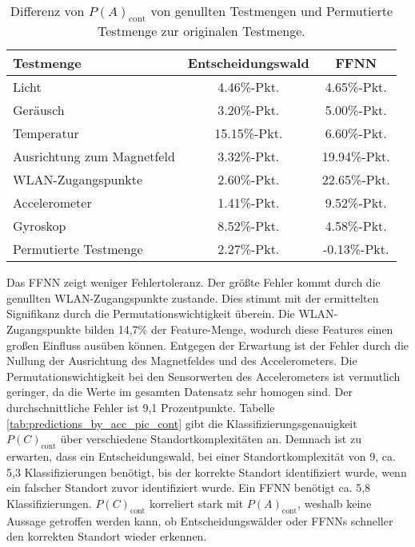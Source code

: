\begin{table}[h!]
    \centering
    \begin{tabular}{ | l | c | c | }
        \hline
        Testmenge & Entscheidungswald & FFNN \\\hline
        Licht & 4.46\%-Pkt. & 4.65\%-Pkt. \\\hline
        Geräusch & 3.20\%-Pkt. & 5.00\%-Pkt. \\\hline
        Temperatur & 15.15\%-Pkt. & 6.60\%-Pkt. \\\hline
        Ausrichtung zum Magnetfeld & 3.32\%-Pkt. & 19.94\%-Pkt. \\\hline
        WLAN-Zugangspunkte & 2.60\%-Pkt. & 22.65\%-Pkt. \\\hline
        Accelerometer & 1.41\%-Pkt. & 9.52\%-Pkt. \\\hline
        Gyroskop & 8.52\%-Pkt. & 4.58\%-Pkt. \\\hline
        Permutierte Testmenge & 2.27\%-Pkt. & -0.13\%-Pkt. \\\hline
    \end{tabular}
    \caption{Differenz von $P(A)_{\text{cont}}$ von genullten Testmengen und Permutierte Testmenge zur originalen Testmenge.}
    \label{tab:robustness_by_acc_cont}
\end{table}
\newline
\newline
Das FFNN zeigt weniger Fehlertoleranz.
Der größte Fehler kommt durch die genullten WLAN-Zugangspunkte zustande.
Dies stimmt mit der ermittelten Signifikanz durch die Permutationswichtigkeit überein.
Die WLAN-Zugangspunkte bilden 14,7\% der Feature-Menge, wodurch diese Features einen großen Einfluss ausüben können.
\newline
Entgegen der Erwartung ist der Fehler durch die Nullung der Ausrichtung des Magnetfeldes und des Accelerometers.
Die Permutationswichtigkeit bei den Sensorwerten des Accelerometers ist vermutlich geringer,
da die Werte im gesamten Datensatz sehr homogen sind.
Der durchschnittliche Fehler ist 9,1 Prozentpunkte.
\newpage
Tabelle \ref{tab:predictions_by_acc_pic_cont} gibt die Klassifizierungsgenauigkeit $P(C)_{\text{cont}}$ über verschiedene Standortkomplexitäten an.
Demnach ist zu erwarten, dass ein Entscheidungswald, bei einer Standortkomplexität von 9, ca. 5,3 Klassifizierungen benötigt, bis der korrekte Standort identifiziert wurde,
wenn ein falscher Standort zuvor identifiziert wurde.
Ein FFNN benötigt ca. 5,8 Klassifizierungen.
$P(C)_{\text{cont}}$ korreliert stark mit $P(A)_{\text{cont}}$, weshalb keine Aussage getroffen werden kann, ob Entscheidungswälder oder FFNNs schneller den korrekten Standort wieder erkennen.
